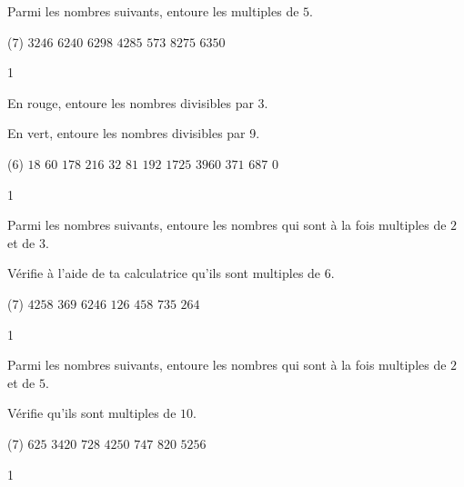 \documentclass[a4paper,11pt]{report}
\begin{document}
\begin{exop}{
    Parmi les nombres suivants, entoure les multiples de $5$. 
    \begin{tasks}(7)
\task[] $3246$ 
\task[] $6240$ 
\task[] $6298$ 
\task[] $4285$ 
\task[] $573$ 
\task[] $8275$ 
\task[] $6350$
    \end{tasks}
}{1}\end{exop}



\begin{exop}{
    En rouge, entoure les nombres divisibles par 3. 

    En vert, entoure les nombres divisibles par 9.

    \begin{tasks}(6)
\task[]    $18$ 
\task[] $60$ 
\task[] $178$ 
\task[] $216$ 
\task[] $32$ 
\task[] $81$ 
\task[] $192$
\task[] $1725$ 
\task[] $3960$ 
\task[] $371$ 
\task[] $687$ 
\task[] $0$
    \end{tasks}
}{1}\end{exop}





\begin{exop}{
    Parmi les nombres suivants, entoure les nombres qui sont à la fois multiples de $2$ et de $3$.

    Vérifie à l'aide de ta calculatrice qu'ils sont multiples de $6$. 

    \begin{tasks}(7)
\tasks[] $4258$ 
\task[] $369$ 
\task[] $6246$ 
\task[] $126$ 
\task[] $458$ 
\task[] $735$ 
\task[] $264$
    \end{tasks}
}{1}\end{exop}





\begin{exop}{
    Parmi les nombres suivants, entoure les nombres qui sont à la fois multiples de $2$ et de $5$. 

    Vérifie qu'ils sont multiples de $10$.

    \begin{tasks}(7)
\task[] $625$ 
\task[] $3420$ 
\task[] $728$ 
\task[] $4250$ 
\task[] $747$ 
\task[] $820$ 
\task[] $5256$
    \end{tasks}
}{1}\end{exop}
\end{document}
